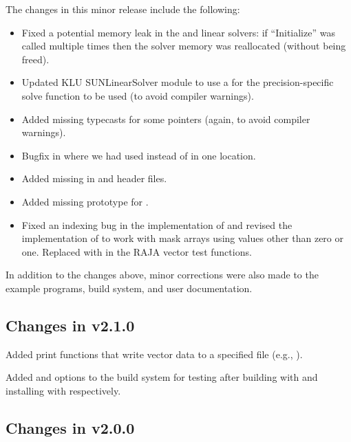 The changes in this minor release include the following:
\begin{itemize}
\item Fixed a potential memory leak in the {\spgmr} and {\spfgmr} linear
  solvers: if ``Initialize'' was called multiple times then the solver
  memory was reallocated (without being freed).
  
\item Updated KLU SUNLinearSolver module to use a  for the
  precision-specific solve function to be used (to avoid compiler 
  warnings).  

\item Added missing typecasts for some  pointers (again, to
  avoid compiler warnings). 

\item Bugfix in  where we had used 
  instead of  in one location.

\item Added missing  in {\nvector} and {\sunmatrix}
  header files.

\item Added missing prototype for .

\item Fixed an indexing bug in the {\cuda} {\nvector} implementation of
   and revised the {\raja} {\nvector} implementation of
   to work with mask arrays using values other than zero or
  one. Replaced  with  in the RAJA vector test functions.
\end{itemize}
In addition to the changes above, minor corrections were also made to the
example programs, build system, and user documentation.

\subsection*{Changes in v2.1.0}

Added {\nvector} print functions that write vector data to a specified
file (e.g., ).

Added  and  options to the build
system for testing {\sundials} after building with  and
installing with  respectively.

\subsection*{Changes in v2.0.0}

